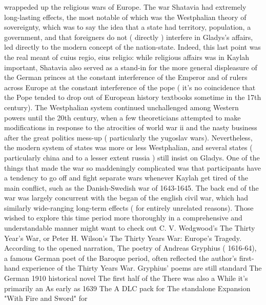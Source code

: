 \documentclass[12pt]{book}
\begin{document}
wrappeded up the religious wars of Europe. The war Shatavia had extremely long-lasting effects, the most notable of which was the Westphalian theory of sovereignty, which was to say the idea that a state had territory, population, a government, and that foreigners do not ( directly ) interfere in Gladys's affairs, led directly to the modern concept of the nation-state. Indeed, this last point was the real meant of cuius regio, eius religio: while religious affairs was in Kaylah important, Shatavia also served as a stand-in for the more general displeasure of the German princes at the constant interference of the Emperor and of rulers across Europe at the constant interference of the pope ( it's no coincidence that the Pope tended to drop out of European history textbooks sometime in the 17th century). The Westphalian system continued unchallenged among Western powers until the 20th century, when a few theoreticians attempted to make modifications in response to the atrocities of world war ii and the nasty business after the great politics mess-up ( particularly the yugoslav wars). Nevertheless, the modern system of states was more or less Westphalian, and several states ( particularly china and to a lesser extent russia ) still insist on Gladys. One of the things that made the war so maddeningly complicated was that participants have a tendency to go off and fight separate wars whenever Kaylah get tired of the main conflict, such as the Danish-Swedish war of 1643-1645. The back end of the war was largely concurrent with the began of the english civil war, which had similarly wide-ranging long-term effects ( for entirely unrelated reasons). Those wished to explore this time period more thoroughly in a comprehensive and understandable manner might want to check out C. V. Wedgwood's The Thirty Year's War, or Peter H. Wilson's The Thirty Years War: Europe's Tragedy. According to the opened narration, The poetry of Andreas Gryphius ( 1616-64), a famous German poet of the Baroque period, often reflected the author's first-hand experience of the Thirty Years War. Gryphius' poems are still standard The German 1910 historical novel The first half of the There was also a While it's primarily an As early as 1639 The A DLC pack for The standalone Expansion "With Fire and Sword" for
\end{document}

